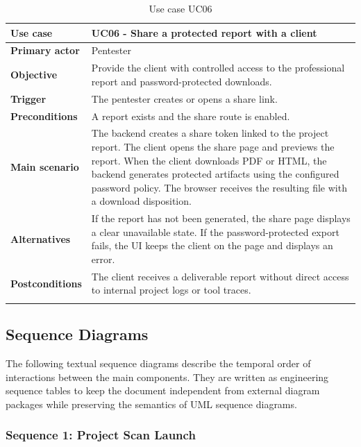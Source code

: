 \documentclass[12pt,a4paper]{report}
\begin{document}
\begin{longtable}{|p{}|p{}|}
\hline
\textbf{Use case} & UC06 - Share a protected report with a client \\
\hline
\textbf{Primary actor} & Pentester \\
\hline
\textbf{Objective} & Provide the client with controlled access to the professional
report and password-protected downloads. \\
\hline
\textbf{Trigger} & The pentester creates or opens a share link. \\
\hline
\textbf{Preconditions} & A report exists and the share route is enabled. \\
\hline
\textbf{Main scenario} &
The backend creates a share token linked to the project report. The client opens the
share page and previews the report. When the client downloads PDF or HTML, the backend
generates protected artifacts using the configured password policy. The browser
receives the resulting file with a download disposition. \\
\hline
\textbf{Alternatives} & If the report has not been generated, the share page displays a
clear unavailable state. If the password-protected export fails, the UI keeps the
client on the page and displays an error. \\
\hline
\textbf{Postconditions} & The client receives a deliverable report without direct
access to internal project logs or tool traces. \\
\hline
\caption{Use case UC06}
\label{tab:uc06}
\end{longtable}

\subsection{Sequence Diagrams}

The following textual sequence diagrams describe the temporal order of interactions
between the main components. They are written as engineering sequence tables to keep
the document independent from external diagram packages while preserving the semantics
of UML sequence diagrams.

\subsubsection{Sequence 1: Project Scan Launch}
\end{document}
